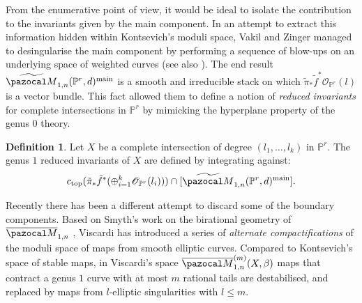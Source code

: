 \documentclass[11pt]{amsart}
\newcommand{\M}[4]{\overline{\pazocal M}_{#1,#2}(#3,#4)}
\newcommand{\PP}{\mathbb P}
\newcommand{\oM}{\overline{\pazocal M}}
\newcommand{\bcd}{\begin{center}\begin{tikzcd}}
\newcommand{\ecd}{\end{tikzcd}\end{center}}
\theoremstyle{plain}
\theoremstyle{definition}
\newtheorem{dfn}[thm]{Definition}
\begin{document}
From the enumerative point of view, it would be ideal to isolate the contribution to the invariants given by the main component.
In an attempt to extract this information hidden within Kontsevich's moduli space, 
Vakil and Zinger managed to desingularise the main component by performing a sequence of blow-ups on an underlying space of weighted curves \cite{VZpreview} \cite{VZ} (see also \cite{HL}). The end result $\widetilde{\pazocal M}_{1,n}(\PP^r,d)^{\rm{main}}$ is a smooth and irreducible stack on which $\tilde\pi_*\tilde f^*\mathcal O_{\PP^r}(l)$ is a vector bundle. This fact allowed them to define a notion of \emph{reduced invariants} for complete intersections in $\PP^r$ by mimicking the hyperplane property of the genus $0$ theory. %

\begin{dfn}
Let $X$ be a complete intersection of degree $(l_1,\ldots,l_k)$ in $\PP^r$. The genus $1$ reduced invariants of $X$ are defined by integrating against: $$ c_{\rm{top}}(\tilde\pi_*\tilde f^*(\oplus_{i=1}^k\mathcal O_{\PP^r}(l_i)))\cap[\widetilde{\pazocal M}_{1,n}(\PP^r,d)^{\rm{main}}].$$
\end{dfn}

Recently there has been a different attempt to discard some of the boundary components. Based on Smyth's work on the birational geometry of $\oM_{1,n}$ \cite{SMY1,SMY2}, Viscardi \cite{VISC} has introduced a series of \emph{alternate compactifications} of the moduli space of maps from smooth elliptic curves. Compared to Kontsevich's space of stable maps, in Viscardi's space $\oM_{1,n}^{(m)}(X,\beta)$ maps that contract a genus $1$ curve with at most $m$ rational tails are destabilised, and replaced by maps from $l$-elliptic singularities with $l\leq m$.
\end{document}
